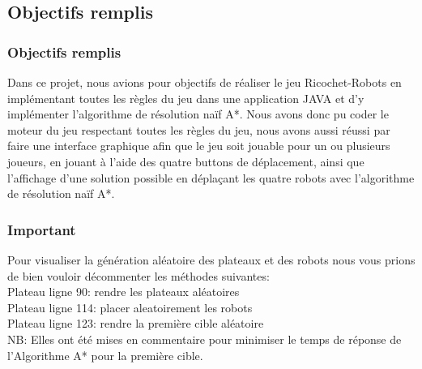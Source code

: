 \documentclass{beamer}
\begin{document}
	\subsection{Objectifs remplis}
	\begin{frame}
		\frametitle{Objectifs remplis}
		
		Dans ce projet, nous avions pour objectifs de réaliser le jeu Ricochet-Robots en implémentant toutes les règles du jeu dans une application JAVA et d’y implémenter l’algorithme de résolution naïf A*. Nous avons donc pu coder le moteur du jeu respectant toutes les règles du jeu, nous avons aussi réussi par faire une interface graphique afin que le jeu soit jouable pour un ou plusieurs joueurs, en jouant à l’aide des quatre buttons de déplacement, ainsi que l’affichage d'une solution possible en déplaçant les quatre robots avec l’algorithme de résolution naïf A*. 
		
	\end{frame}

		\begin{frame}
			\frametitle{Important}
				Pour visualiser la génération aléatoire des plateaux et des robots nous vous prions de bien vouloir décommenter les méthodes 
				suivantes: 
				\\Plateau ligne 90: rendre les plateaux aléatoires
				\\Plateau ligne 114: placer aleatoirement les robots
				\\Plateau ligne 123: rendre la première cible aléatoire
				\\NB: Elles ont été mises en commentaire pour minimiser le temps de réponse de l'Algorithme A* pour la première cible.
		\end{frame}
	
\end{document}
